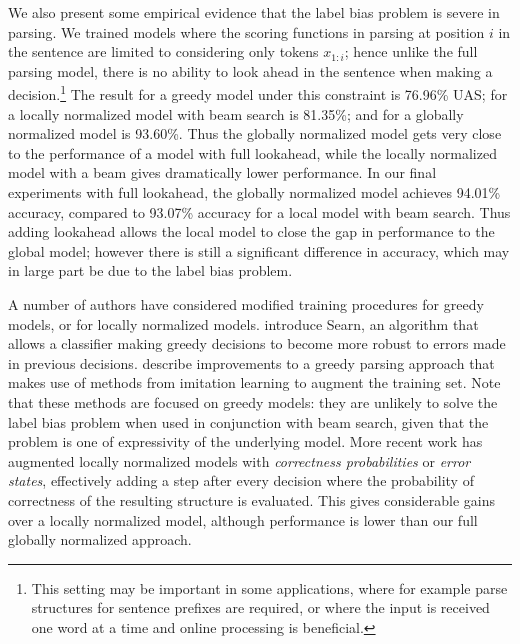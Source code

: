 We also present some
empirical evidence that the label bias problem is severe in
parsing. We trained models where the scoring functions in parsing
at position $i$ in the sentence are limited to considering only tokens
$x_{1:i}$; hence unlike the full parsing model, there is no
ability to look ahead in the sentence when making a
decision.\footnote{This setting may be important in some applications,
  where for example parse structures for sentence prefixes are
  required, or where the input is received one word at a time and
  online processing is beneficial.} The result for a greedy model
under this constraint is 76.96\% UAS; for a locally normalized model
with beam search is 81.35\%; and for a globally normalized model
is 93.60\%. Thus the globally normalized model gets very close to the
performance of a model with full lookahead, while the locally
normalized model with a beam gives dramatically lower performance.  In
our final experiments with full lookahead, the globally normalized
model achieves 94.01\% accuracy, compared to 93.07\% accuracy for a
local model with beam search. Thus adding lookahead allows the local
model to close the gap in performance to the global model; however
there is still a significant difference in accuracy, which may in
large part be due to the label bias problem.

A number of authors have considered modified training procedures for
greedy models, or for locally normalized models.
 introduce Searn, an algorithm that allows a
classifier making greedy decisions to become more robust to errors
made in previous decisions.  describe
improvements to a greedy parsing approach that makes use of methods
from imitation learning \cite{bagnell2011imitation} to augment the
training set. Note that these methods are focused on greedy
models: they are unlikely to solve the label bias problem when used in
conjunction with beam search, given that the problem is one of
expressivity of the underlying model. More recent work
\cite{henderson2015,vaswani2016} has augmented locally normalized
models with {\em correctness probabilities} or {\em error states},
effectively adding a step after every decision where the probability
of correctness of the resulting structure is evaluated. This gives
considerable gains over a locally normalized model, although
performance is lower than our full globally normalized approach.
